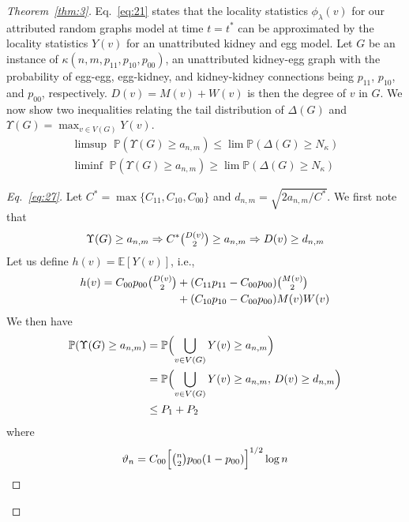 \documentclass[draftcls]{IEEEtran}
\theoremstyle{definition}
\begin{document}
\begin{proof}[Theorem~\ref{thm:3}]
Eq.~\eqref{eq:21} states that the locality statistics
$\phi_\lambda(v)$ for our
attributed random graphs model at time $t = t^{*}$ can be approximated by
the locality statistics $Y(v)$ for an unattributed kidney and egg
model. Let $G$ be an instance of $\kappa(n,m,p_{11},
p_{10}, p_{00})$, an unattributed kidney-egg graph with the
probability of egg-egg, egg-kidney, and kidney-kidney connections
being $p_{11}$, $p_{10}$, and $p_{00}$, respectively. $D(v) = M(v) + W(v)$ is then the degree
of $v$ in $G$. We now show two
inequalities relating the tail distribution of 
$\Delta(G)$ and $\Upsilon(G) = \max_{v \in V(G)} Y(v)$.
\begin{gather}
  \label{eq:27}
    \limsup\,\, \mathbb{P}( \Upsilon(G) \geq a_{n,m} ) \leq \lim
   \mathbb{P}( \Delta(G) \geq N_\kappa) \\
   \label{eq:30}
  \liminf\,\, \mathbb{P}( \Upsilon(G) \geq a_{n,m} ) \geq \lim \mathbb{P}(
  \Delta(G) \geq N_{\kappa})
\end{gather}
\begin{proof}[Eq.~\eqref{eq:27}]
 Let $C^{*} = \max\{C_{11},
C_{10}, C_{00}\}$ and $d_{n,m} = \sqrt{2 a_{n,m}/C^{*}}$. We first
note that
\begin{equation*}
\Upsilon(G) \geq a_{n,m} \Rightarrow C^{*} \tbinom{D(v)}{2} \geq
a_{n,m} \Rightarrow D(v) \geq d_{n,m} 
\end{equation*}
Let us define $h(v) = \mathbb{E}[Y(v)]$, i.e., 
\begin{equation*}
  \begin{split}
  h(v) = C_{00}p_{00} \tbinom{D(v)}{2} &+ (C_{11} p_{11} - C_{00}
  p_{00}) \tbinom{M(v)}{2} \\ &+ (C_{10} p_{10} - C_{00} p_{00}) M(v) W(v)
  \end{split}
\end{equation*}
We then have
  \begin{equation*}
    \label{eq:31}
    \begin{split}
    \mathbb{P}(\Upsilon(G) \geq a_{n,m}) &= \mathbb{P}\Bigl( \bigcup_{v
      \in V(G)} Y(v) \geq a_{n,m}\Bigr) \\
    &= \mathbb{P}\Bigl( \bigcup_{v
      \in V(G)} Y(v) \geq a_{n,m}, \, D(v) \geq d_{n,m} \Bigr) \\
    &\leq P_1 + P_2
    \end{split}
  \end{equation*}
  where 
  \begin{align*}
    \vartheta_n &= C_{00} \Bigl[ \tbinom{n}{2} p_{00} (1 -
    p_{00})\Bigr]^{1/2} \log{n} \\

\end{align*}
\end{proof}
\end{proof}
\end{document}
